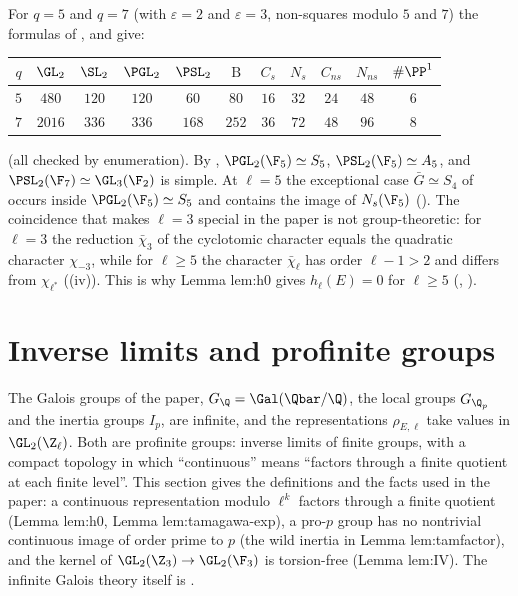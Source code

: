 \begin{example}[$\GL_2(\F_5)$ and $\GL_2(\F_7)$]\label{ex:groups:gl2f5f7}
For $q=5$ and $q=7$ (with $\varepsilon=2$ and $\varepsilon=3$, non-squares modulo $5$ and $7$) the formulas of ,  and
 give:
\begin{center}
\small
\begin{tabular}{ccccccccccc}
\toprule
$q$ & $\GL_2$ & $\SL_2$ & $\PGL_2$ & $\PSL_2$ & $\mathrm B$ & $C_s$ & $N_s$ & $C_{ns}$ & $N_{ns}$ & $\#\PP^1$\\
\midrule
$5$ & $480$ & $120$ & $120$ & $60$ & $80$ & $16$ & $32$ & $24$ & $48$ & $6$\\
$7$ & $2016$ & $336$ & $336$ & $168$ & $252$ & $36$ & $72$ & $48$ & $96$ & $8$\\
\bottomrule
\end{tabular}
\end{center}
(all checked by enumeration). By , $\PGL_2(\F_5)\simeq S_5$, $\PSL_2(\F_5)\simeq A_5$, and $\PSL_2(\F_7)\simeq\GL_3(\F_2)$ is simple. At $\ell=5$ the
exceptional case $\bar G\simeq S_4$ of  occurs inside $\PGL_2(\F_5)\simeq S_5$ and contains the image of $N_s(\F_5)$ (). The
coincidence that makes $\ell=3$ special in the paper is not group-theoretic: for $\ell=3$ the reduction $\bar\chi_3$ of the cyclotomic character equals the quadratic
character $\chi_{-3}$, while for $\ell\ge5$ the character $\bar\chi_\ell$ has order $\ell-1>2$ and differs from $\chi_{\ell^*}$ ((iv)). This is why
Lemma lem:h0 gives $h_\ell(E)=0$ for $\ell\ge5$ (, ).
\end{example}

\section{Inverse limits and profinite groups}\label{sec:groups:profinite}

The Galois groups of the paper, $G_\Q=\Gal(\Qbar/\Q)$, the local groups $G_{\Q_p}$ and the inertia groups $I_p$, are infinite, and the representations $\rho_{E,\ell}$
take values in $\GL_2(\Z_\ell)$. Both are profinite groups: inverse limits of finite groups, with a compact topology in which ``continuous'' means ``factors through a
finite quotient at each finite level''. This section gives the definitions and the facts used in the paper: a continuous representation modulo $\ell^k$ factors through a
finite quotient (Lemma lem:h0, Lemma lem:tamagawa-exp), a pro-$p$ group has no nontrivial continuous image of order prime to $p$ (the wild inertia in Lemma
lem:tamfactor), and the kernel of $\GL_2(\Z_3)\to\GL_2(\F_3)$ is torsion-free (Lemma lem:IV). The infinite Galois theory itself is .

